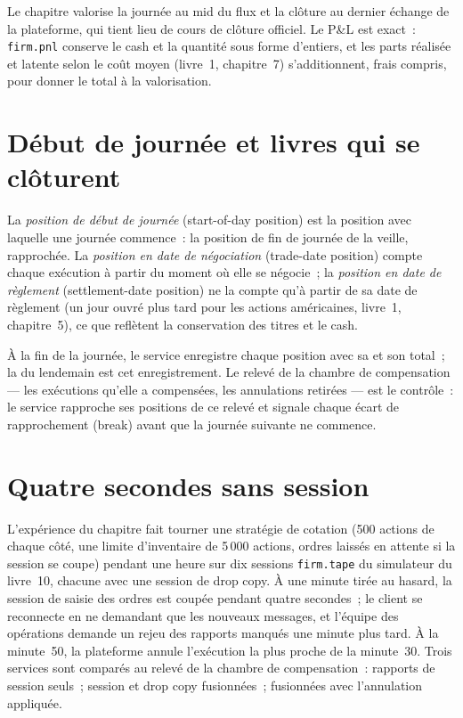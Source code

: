 Le chapitre valorise la journée au mid du flux et la clôture au dernier échange de la plateforme, qui tient lieu de cours de clôture officiel. Le P\&L est
exact~: \texttt{firm.pnl} conserve le cash et la quantité sous forme d'entiers, et les parts réalisée et latente selon le coût moyen (livre~1, chapitre~7)
s'additionnent, frais compris, pour donner le total à la valorisation.

\section{Début de journée et livres qui se clôturent}

\begin{definition}\label{def:pl:position-and-pnl-services:sod}
La \emph{position de début de journée} (start-of-day position) est la position avec laquelle une journée commence~: la position de fin de journée de la veille,
rapprochée. La \emph{position en date de négociation} (trade-date position) compte chaque exécution à partir du moment où elle se négocie~; la
\emph{position en date de règlement} (settlement-date position) ne la compte qu'à partir de sa date de règlement (un jour ouvré plus tard pour les actions américaines,
livre~1, chapitre~5), ce que reflètent la conservation des titres et le cash.
\end{definition}

À la fin de la journée, le service enregistre chaque position avec sa  et son total~; la  du lendemain est cet
enregistrement. Le relevé de la chambre de compensation --- les exécutions qu'elle a compensées, les annulations retirées --- est le contrôle~: le service rapproche ses positions
de ce relevé et signale chaque écart de rapprochement (break) avant que la journée suivante ne commence.

\section{Quatre secondes sans session}

L'expérience du chapitre fait tourner une stratégie de cotation (500 actions de chaque côté, une limite d'inventaire de 5\,000 actions, ordres laissés en attente si la session
se coupe) pendant une heure sur dix sessions \texttt{firm.tape} du simulateur du livre~10, chacune avec une session de drop copy. À une minute tirée au hasard, la session de saisie des ordres
est coupée pendant quatre secondes~; le client se reconnecte en ne demandant que les nouveaux messages, et l'équipe des opérations demande un rejeu des rapports manqués une
minute plus tard. À la minute~50, la plateforme annule l'exécution la plus proche de la minute~30. Trois services sont comparés au relevé de la chambre de compensation~: rapports de session
seuls~; session et drop copy fusionnées~; fusionnées avec l'annulation appliquée.

